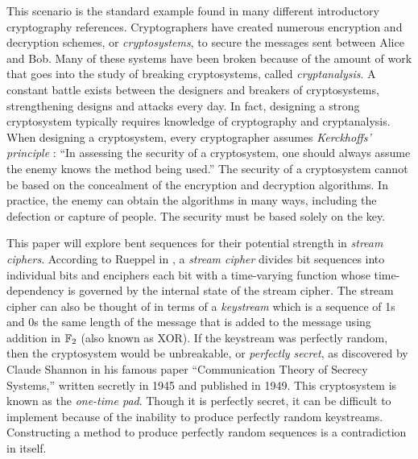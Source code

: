 \par This scenario is the standard example found in many different
introductory cryptography references. Cryptographers have created numerous
encryption and decryption schemes, or {\em cryptosystems}, to secure the
messages sent between Alice and Bob. Many of these systems have been broken
because of the amount of work that goes into the study of breaking
cryptosystems, called {\em cryptanalysis}. A constant battle exists between
the designers and breakers of cryptosystems, strengthening designs and
attacks every day. In fact, designing a strong cryptosystem typically
requires knowledge of cryptography and cryptanalysis. When designing a
cryptosystem, every cryptographer assumes {\em Kerckhoffs' principle}
\cite{bk:tw06}: ``In assessing the security of a cryptosystem, one should always
assume the enemy knows the method being used.'' The security of a cryptosystem
cannot be based on the concealment of the encryption and decryption algorithms.
In practice, the enemy can obtain the algorithms in many ways, including the
defection or capture of people. The security must be based solely on the key.

\par This paper will explore bent sequences for their potential strength in
{\it stream ciphers}. According to Rueppel in \cite{bk:r86}, a {\em stream cipher}
divides bit sequences into individual bits and enciphers each bit with a
time-varying function whose time-dependency is governed by the internal state
of the stream cipher.  The stream cipher can also be thought of in terms of a
{\em keystream} which is a sequence of 1s and 0s the same length of the
message that is added to the message using addition in $\mathbb{F}_2$ (also known
as XOR). If the keystream was perfectly random, then the cryptosystem would
be unbreakable, or {\em perfectly secret}, as discovered by Claude Shannon
in his famous paper ``Communication Theory of Secrecy Systems,'' written
secretly in 1945 and published in 1949. This cryptosystem is known as the
{\em one-time pad}. Though it is perfectly secret, it can be difficult to
implement because of the inability to produce perfectly random keystreams.
Constructing a method to produce perfectly random sequences is a
contradiction in itself.

